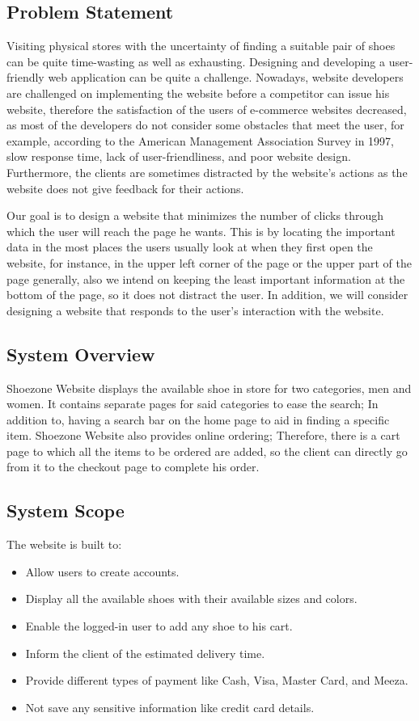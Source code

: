 \documentclass[12pt]{article}
\begin{document}
\subsection{Problem Statement}
Visiting physical stores with the uncertainty of finding a suitable pair of shoes can be quite time-wasting as well as exhausting. Designing and developing a user-friendly web application can be quite a challenge. Nowadays, website developers are challenged on implementing the website before a competitor can issue his website, therefore the satisfaction of the users of e-commerce websites decreased, as most of the developers do not consider some obstacles that meet the user, for example, according to the American Management Association Survey in 1997, slow response time, lack of user-friendliness, and poor website design. Furthermore, the clients are sometimes distracted by the website’s actions as the website does not give feedback for their actions.

Our goal is to design a website that minimizes the number of clicks through which the user will reach the page he wants. This is by locating the important data in the most places the users usually look at when they first open the website, for instance, in the upper left corner of the page or the upper part of the page generally, also we intend on keeping the least important information at the bottom of the page, so it does not distract the user. In addition, we will consider designing a website that responds to the user’s interaction with the website.


\subsection{System Overview}
Shoezone Website displays the available shoe in store for two categories, men and women. It contains separate pages for said categories to ease the search; In addition to, having a search bar on the home page to aid in finding a specific item. Shoezone Website also provides online ordering; Therefore, there is a cart page to which all the items to be ordered are added, so the client can directly go from it to the checkout page to complete his order.

\subsection{System Scope}
The website is built to:
\begin{itemize}
 \item Allow users to create accounts.
 \item Display all the available shoes with their available sizes and colors.
 \item Enable the logged-in user to add any shoe to his cart.
 \item Inform the client of the estimated delivery time.
 \item Provide different types of payment like Cash, Visa, Master Card, and Meeza.   
 \item Not save any sensitive information like credit card details.
\end{itemize}
\end{document}
